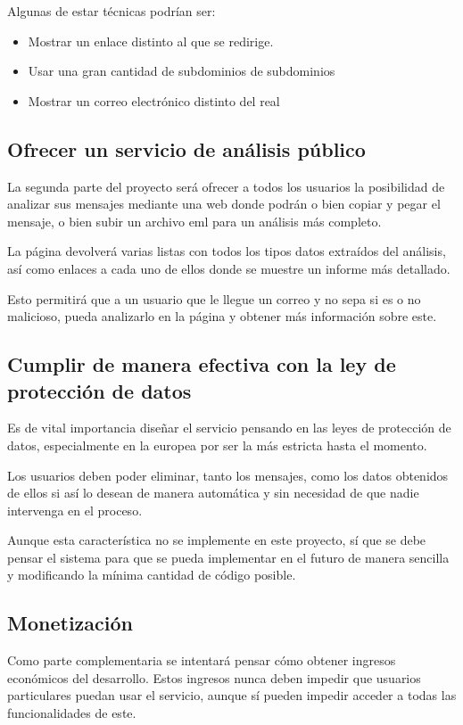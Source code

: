 Algunas de estar técnicas podrían ser: 
\begin{itemize}
    \item Mostrar un enlace distinto al que se redirige.
    \item Usar una gran cantidad de subdominios de subdominios
    \item Mostrar un correo electrónico distinto del real
\end{itemize}

\subsection{Ofrecer un servicio de análisis público}
La segunda parte del proyecto será ofrecer a todos los usuarios la posibilidad de analizar sus mensajes mediante una web donde podrán o bien copiar y pegar el mensaje, o bien subir un archivo eml para un análisis más completo. 

La página devolverá varias listas con todos los tipos datos extraídos del análisis, así como enlaces a cada uno de ellos donde se muestre un informe más detallado.

Esto permitirá que a un usuario que le llegue un correo y no sepa si es o no malicioso, pueda analizarlo en la página y obtener más información sobre este.

\subsection{Cumplir de manera efectiva con la ley de protección de datos}
Es de vital importancia diseñar el servicio pensando en las leyes de protección de datos, especialmente en la europea por ser la más estricta hasta el momento. 

Los usuarios deben poder eliminar, tanto los mensajes, como los datos obtenidos de ellos si así lo desean de manera automática y sin necesidad de que nadie intervenga en el proceso. 

Aunque esta característica no se implemente en este proyecto, sí que se debe pensar el sistema para que se pueda implementar en el futuro de manera sencilla y modificando la mínima cantidad de código posible. 

\subsection{Monetización}
Como parte complementaria se intentará pensar cómo obtener ingresos económicos del desarrollo. Estos ingresos nunca deben impedir que usuarios particulares puedan usar el servicio, aunque sí pueden impedir acceder a todas las funcionalidades de este. 

